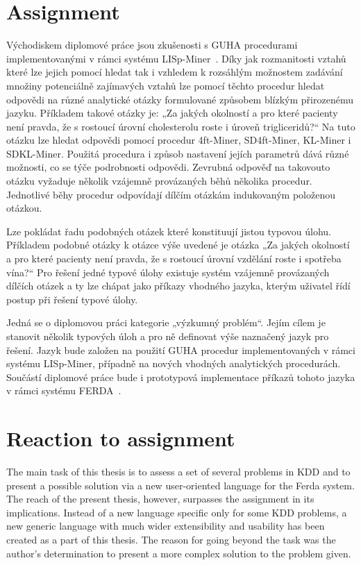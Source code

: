 \documentclass[a4paper,12pt]{book}
\begin{document}
\section{Assignment}
Východiskem diplomové práce jsou zkušenosti s GUHA procedurami implementovanými v rámci systému LISp-Miner~\cite{GMGC}. Díky jak rozmanitosti vztahů které lze jejich pomocí hledat tak i vzhledem k rozsáhlým možnostem za\-dá\-vá\-ní množiny potenciálně zajímavých vztahů lze pomocí těchto procedur hledat odpovědi na různé analytické otázky formulované způsobem blízkým přirozenému jazyku. Příkladem takové otázky je: „Za jakých okolností a pro které pacienty není pravda, že s rostoucí úrovní cholesterolu roste i úroveň trigliceridů?“ Na tuto otázku lze hledat odpovědi pomocí procedur 4ft-Miner, SD4ft-Miner, KL-Miner i SDKL-Miner. Použitá procedura i způsob nastavení jejích parametrů dává různé možnosti, co se týče podrobnosti odpovědi. Zevrubná odpověď na takovouto otázku vyžaduje několik vzájemně pro\-vá\-za\-ných běhů několika procedur. Jednotlivé běhy procedur odpovídají dílčím otázkám indukovaným položenou otázkou.

Lze pokládat řadu podobných otázek které konstituují jistou typovou úlohu. Příkladem podobné otázky k otázce výše uvedené je otázka „Za jakých okolností a pro které pacienty není pravda, že s rostoucí úrovní vzdělání roste i spotřeba vína?“ Pro řešení jedné typové úlohy existuje systém vzájemně provázaných dílčích otázek a ty lze chápat jako příkazy vhodného jazyka, kterým uživatel řídí postup při řešení typové úlohy.

Jedná se o diplomovou práci kategorie „výzkumný problém“. Jejím cílem je stanovit několik typových úloh a pro ně definovat výše naznačený jazyk pro řešení. Jazyk bude založen na použití GUHA procedur implementovaných v rámci systému LISp-Miner, případně na nových vhodných analytických procedurách. Součástí diplomové práce bude i prototypová implementace příkazů tohoto jazyka v rámci systému FERDA~\cite{znalosti2006}.

\section{Reaction to assignment}

The main task of this thesis is to assess a set of several problems in KDD and to present a possible solution via a new user-oriented language for the Ferda system. The reach of the present thesis, however, surpasses the assignment in its implications. Instead of a new language specific only for some KDD problems, a new generic language with much wider extensibility and usability has been created as a part of this thesis. The reason for going beyond the task was the author's determination to present a more complex solution to the problem given. 
\end{document}
